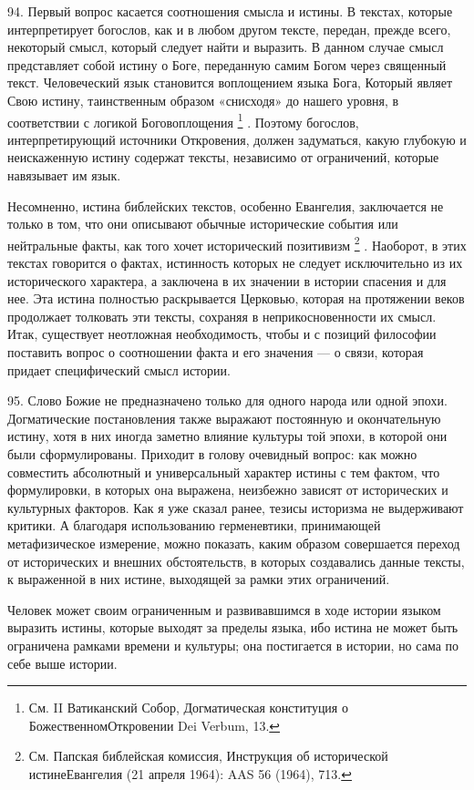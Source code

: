 \documentclass[a5paper,10pt]{article}
\begin{document}
94. Первый вопрос касается соотношения смысла и истины. В текстах, которые
интерпретирует богослов, как и в любом другом тексте, передан, прежде всего,
некоторый смысл, который следует найти и выразить. В данном случае смысл
представляет собой истину о Боге, переданную самим Богом через священный текст.
Человеческий язык становится воплощением языка Бога, Который являет Свою
истину, таинственным образом «снисходя» до нашего уровня, в соответствии с
логикой Боговоплощения \footnote{См. II Ватиканский Собор, Догматическая
конституция о БожественномОткровении Dei Verbum, 13.} . Поэтому богослов,
интерпретирующий источники Откровения, должен задуматься, какую глубокую и
неискаженную истину содержат тексты, независимо от ограничений, которые
навязывает им язык.

Несомненно, истина библейских текстов, особенно Евангелия, заключается не
только в том, что они описывают обычные исторические события или нейтральные
факты, как того хочет исторический позитивизм \footnote{См. Папская библейская
комиссия, Инструкция об исторической истинеЕвангелия (21 апреля 1964): AAS 56
(1964), 713.} . Наоборот, в этих текстах говорится о фактах, истинность которых
не следует исключительно из их исторического характера, а заключена в их
значении в истории спасения и для нее. Эта истина полностью раскрывается
Церковью, которая на протяжении веков продолжает толковать эти тексты, сохраняя
в неприкосновенности их смысл. Итак, существует неотложная необходимость, чтобы
и с позиций философии поставить вопрос о соотношении факта и его значения — о
связи, которая придает специфический смысл истории.

95. Слово Божие не предназначено только для одного народа или одной эпохи.
Догматические постановления также выражают постоянную и окончательную истину,
хотя в них иногда заметно влияние культуры той эпохи, в которой они были
сформулированы. Приходит в голову очевидный вопрос: как можно совместить
абсолютный и универсальный характер истины с тем фактом, что формулировки, в
которых она выражена, неизбежно зависят от исторических и культурных факторов.
Как я уже сказал ранее, тезисы историзма не выдерживают критики. А благодаря
использованию герменевтики, принимающей метафизическое измерение, можно
показать, каким образом совершается переход от исторических и внешних
обстоятельств, в которых создавались данные тексты, к выраженной в них истине,
выходящей за рамки этих ограничений.

Человек может своим ограниченным и развивавшимся в ходе истории языком выразить
истины, которые выходят за пределы языка, ибо истина не может быть ограничена
рамками времени и культуры; она постигается в истории, но сама по себе выше
истории.
\end{document}
